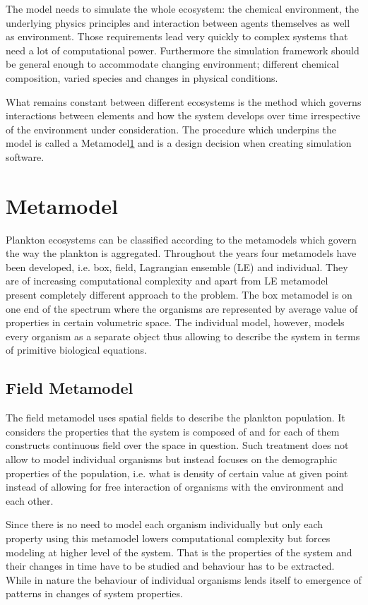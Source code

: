 \documentclass[12pt, a4paper]{report}
\begin{document}
The model needs to simulate the whole ecosystem: the chemical environment,
the underlying physics principles and interaction between agents themselves
as well as environment. Those requirements lead very quickly to complex systems
that need a lot of computational power. Furthermore the simulation framework
should be general enough to accommodate changing environment; different chemical composition,
varied species and changes in physical conditions.

What remains constant between different ecosystems is the method which governs interactions
between elements and how the system develops over time irrespective of the environment
under consideration. The procedure which underpins the model is called a Metamodel\ref{sec:meta}
and is a design decision when creating simulation software.

\section{Metamodel}\label{sec:meta}
Plankton ecosystems can be classified according to the metamodels which govern
the way the plankton is aggregated. Throughout the years four metamodels have
been developed, i.e. box, field, Lagrangian ensemble (LE) and individual. They
are of increasing computational complexity and apart from LE metamodel present
completely different approach to the problem. The box metamodel is on one end
of the spectrum where the organisms are represented by average value of
properties in certain volumetric space. The individual model, however,
models every organism as a separate object thus allowing to describe the system
in terms of primitive biological equations.

\subsection{Field Metamodel}\label{para:field-meta}
The field metamodel uses spatial fields to describe the plankton population.
It considers the properties that the system is composed of and for each
of them constructs continuous field over the space in question. Such
treatment does not allow to model individual organisms but instead
focuses on the demographic properties of the population, i.e. what is
density of certain value at given point instead of allowing for free
interaction of organisms with the environment and each other.

Since there is no need to model each organism individually but only
each property using this metamodel lowers computational complexity
but forces modeling at higher level of the system. That is the
properties of the system and their changes in time have to be studied
and behaviour has to be extracted. While in nature the behaviour of
individual organisms lends itself to emergence of patterns in changes
of system properties.
\end{document}
